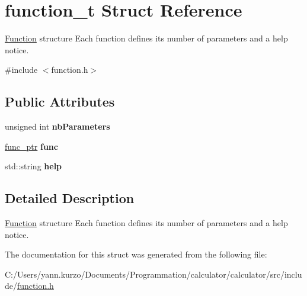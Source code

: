 \hypertarget{structfunction__t}{}\section{function\+\_\+t Struct Reference}
\label{structfunction__t}


\hyperlink{class_function}{Function} structure Each function defines its number of parameters and a help notice.  




{\ttfamily \#include $<$function.\+h$>$}

\subsection*{Public Attributes}
\begin{DoxyCompactItemize}
\item 
\hypertarget{structfunction__t_a647add70a5264bc6bea452726cae9591}{}unsigned int {\bfseries nb\+Parameters}\label{structfunction__t_a647add70a5264bc6bea452726cae9591}

\item 
\hypertarget{structfunction__t_a037cf75435952339d3d885e69eddb87e}{}\hyperlink{function_8h_a171e664ee3179d3d1f1a7b04a747724c}{func\+\_\+ptr} {\bfseries func}\label{structfunction__t_a037cf75435952339d3d885e69eddb87e}

\item 
\hypertarget{structfunction__t_a8087fbf54eedd85f35f48dabdc83b228}{}std\+::string {\bfseries help}\label{structfunction__t_a8087fbf54eedd85f35f48dabdc83b228}

\end{DoxyCompactItemize}


\subsection{Detailed Description}
\hyperlink{class_function}{Function} structure Each function defines its number of parameters and a help notice. 

The documentation for this struct was generated from the following file\+:\begin{DoxyCompactItemize}
\item 
C\+:/\+Users/yann.\+kurzo/\+Documents/\+Programmation/calculator/calculator/src/include/\hyperlink{function_8h}{function.\+h}\end{DoxyCompactItemize}
